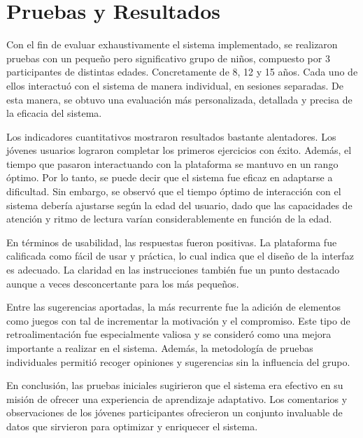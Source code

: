 \chapter{Pruebas y Resultados} \label{chap:resultadosExperimentales}

Con el fin de evaluar exhaustivamente el sistema implementado, se realizaron pruebas con un pequeño pero significativo grupo de niños, compuesto por 3 participantes de distintas edades. Concretamente de 8, 12 y 15 años. Cada uno de ellos interactuó con el sistema de manera individual, en sesiones separadas. De esta manera, se obtuvo una evaluación más personalizada, detallada y precisa de la eficacia del sistema.

Los indicadores cuantitativos mostraron resultados bastante alentadores. Los jóvenes usuarios lograron completar los primeros ejercicios con éxito. Además, el tiempo que pasaron interactuando con la plataforma se mantuvo en un rango óptimo. Por lo tanto, se puede decir que el sistema fue eficaz en adaptarse a dificultad. Sin embargo, se observó que el tiempo óptimo de interacción con el sistema debería ajustarse según la edad del usuario, dado que las capacidades de atención y ritmo de lectura varían considerablemente en función de la edad. 

En términos de usabilidad, las respuestas fueron positivas. La plataforma fue calificada como fácil de usar y práctica, lo cual indica que el diseño de la interfaz es adecuado. La claridad en las instrucciones también fue un punto destacado aunque a veces desconcertante para los más pequeños.

Entre las sugerencias aportadas, la más recurrente fue la adición de elementos como juegos con tal de incrementar la motivación y el compromiso. Este tipo de retroalimentación fue especialmente valiosa y se consideró como una mejora importante a realizar en el sistema. Además, la metodología de pruebas individuales permitió recoger opiniones y sugerencias sin la influencia del grupo.

En conclusión, las pruebas iniciales sugirieron que el sistema era efectivo en su misión de ofrecer una experiencia de aprendizaje adaptativo. Los comentarios y observaciones de los jóvenes participantes ofrecieron un conjunto invaluable de datos que sirvieron para optimizar y enriquecer el sistema.